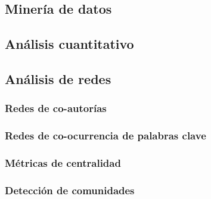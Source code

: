 \subsection{Minería de datos}

\subsection{Análisis cuantitativo}

\subsection{Análisis de redes}

\subsubsection{Redes de co-autorías}

\subsubsection{Redes de co-ocurrencia de palabras clave}

\subsubsection{Métricas de centralidad}

\subsubsection{Detección de comunidades}
